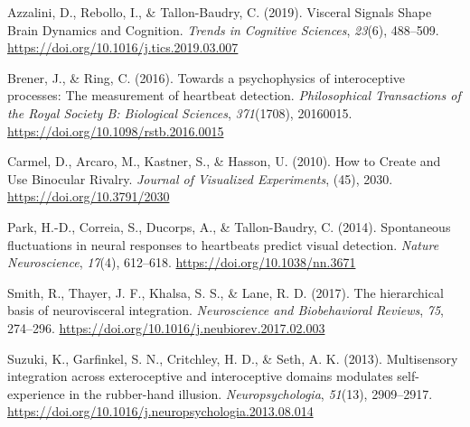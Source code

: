 \documentclass[
  man]{apa6}
\newlength{\cslhangindent}
\newlength{\cslentryspacingunit} %
\newenvironment{CSLReferences}[2] %
 {%
  \setlength{\parindent}{0pt}
  \ifodd #1
  \let\oldpar\par
  \def\par{\hangindent=\cslhangindent\oldpar}
  \fi
  \setlength{\parskip}{#2\cslentryspacingunit}
 }%
 {}
\begin{document}
\hypertarget{refs}{}
\begin{CSLReferences}{1}{0}
\leavevmode{}%
Azzalini, D., Rebollo, I., \& Tallon-Baudry, C. (2019). Visceral {Signals} {Shape} {Brain} {Dynamics} and {Cognition}. \emph{Trends in Cognitive Sciences}, \emph{23}(6), 488--509. \url{https://doi.org/10.1016/j.tics.2019.03.007}

\leavevmode{}%
Brener, J., \& Ring, C. (2016). Towards a psychophysics of interoceptive processes: The measurement of heartbeat detection. \emph{Philosophical Transactions of the Royal Society B: Biological Sciences}, \emph{371}(1708), 20160015. \url{https://doi.org/10.1098/rstb.2016.0015}

\leavevmode{}%
Carmel, D., Arcaro, M., Kastner, S., \& Hasson, U. (2010). How to {Create} and {Use} {Binocular} {Rivalry}. \emph{Journal of Visualized Experiments}, (45), 2030. \url{https://doi.org/10.3791/2030}

\leavevmode{}%
Park, H.-D., Correia, S., Ducorps, A., \& Tallon-Baudry, C. (2014). Spontaneous fluctuations in neural responses to heartbeats predict visual detection. \emph{Nature Neuroscience}, \emph{17}(4), 612--618. \url{https://doi.org/10.1038/nn.3671}

\leavevmode{}%
Smith, R., Thayer, J. F., Khalsa, S. S., \& Lane, R. D. (2017). The hierarchical basis of neurovisceral integration. \emph{Neuroscience and Biobehavioral Reviews}, \emph{75}, 274--296. \url{https://doi.org/10.1016/j.neubiorev.2017.02.003}

\leavevmode{}%
Suzuki, K., Garfinkel, S. N., Critchley, H. D., \& Seth, A. K. (2013). Multisensory integration across exteroceptive and interoceptive domains modulates self-experience in the rubber-hand illusion. \emph{Neuropsychologia}, \emph{51}(13), 2909--2917. \url{https://doi.org/10.1016/j.neuropsychologia.2013.08.014}

\end{CSLReferences}
\end{document}
